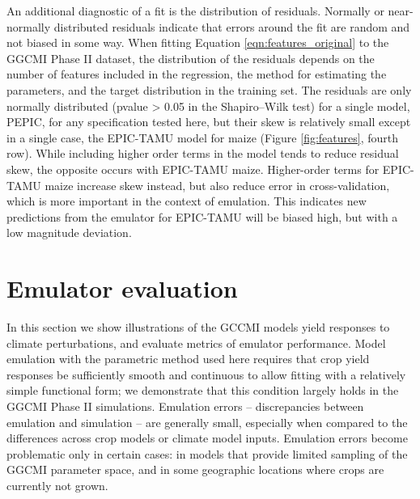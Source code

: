 \documentclass[gmd, manuscript]{copernicus} %
\begin{document}
An additional diagnostic of a fit is the distribution of residuals. Normally or near-normally distributed residuals indicate that errors around the fit are random and not biased in some way. 
When fitting Equation \ref{eqn:features_original} to the GGCMI Phase II dataset, the distribution of the residuals depends on the number of features included in the regression, the method for estimating the parameters, and the target distribution in the training set. The residuals are only normally distributed (pvalue > 0.05 in the Shapiro–Wilk test) for a single model, PEPIC, for any specification tested here, but %
their skew is relatively small except in a single case, the EPIC-TAMU model for maize (Figure \ref{fig:features}, fourth row).
While including higher order terms in the model tends to reduce residual skew, the opposite occurs with EPIC-TAMU maize. 
Higher-order terms for EPIC-TAMU maize increase skew instead, but also reduce error in cross-validation, which is more important in the context of emulation.
This indicates new predictions from the emulator for EPIC-TAMU will be biased high, but with a low magnitude deviation.  


\section{Emulator evaluation}
\label{S:4}
In this section we show illustrations of the GCCMI models yield responses to climate perturbations, and evaluate metrics of emulator performance. 
Model emulation with the parametric method used here requires that crop yield responses be sufficiently smooth and continuous to allow fitting with a relatively simple functional form; we demonstrate that this condition largely holds in the GGCMI Phase II simulations. Emulation errors -- discrepancies between emulation and simulation --  are generally small, especially when compared to the differences across crop models or climate model inputs.
Emulation errors become problematic only in certain cases: in models that provide limited sampling of the GGCMI parameter space, and in some geographic locations where crops are currently not grown. 
\end{document}

